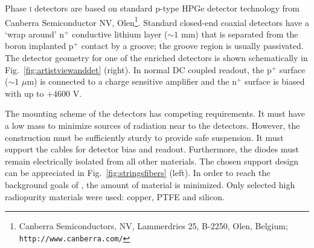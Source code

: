 Phase \textsc{i} detectors are based on standard p-type HPGe detector technology from Canberra Semiconductor NV, Olen\footnote{Canberra Semiconductors, NV, Lammerdries 25, B-2250, Olen, Belgium; \texttt{http://www.canberra.com/}}. Standard closed-end coaxial detectors have a `wrap around' $\text{n}^+$ conductive lithium layer ($\sim1$ mm) that is separated from the boron implanted $\text{p}^+$ contact by a groove; the groove region is usually passivated. The detector geometry for one of the enriched detectors is shown schematically in Fig.~\ref{fig:artistviewanddet} (right). In normal DC coupled readout, the p$^+$ surface ($\sim1$ $\mu$m) is connected to a charge sensitive amplifier and the n$^+$ surface is biased with up to +4600 V.

The mounting scheme of the detectors has competing requirements. It must have a low mass to minimize sources of radiation near to the detectors. However, the construction must be sufficiently sturdy to provide safe suspension. It must support the cables for detector bias and readout. Furthermore, the diodes must remain electrically isolated from all other materials. The chosen support design can be appreciated in Fig.~\ref{fig:stringsfibers} (left). In order to reach the background goals of {\gerda}, the amount of material is minimized. Only selected high radiopurity materials were used: copper, PTFE and silicon.

